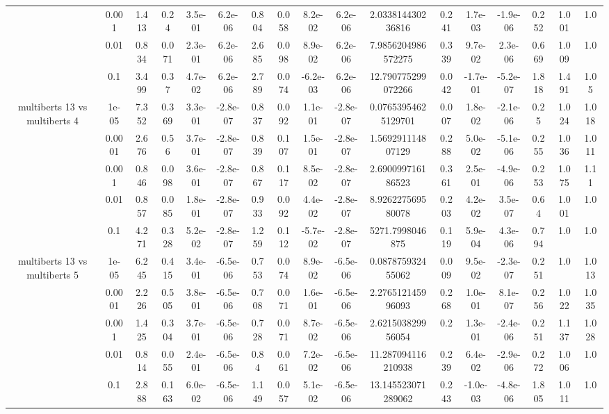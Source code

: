 \begin{tabular}{|c|c|c|c|c|c|c|c|c|c|c|c|c|c|c|c|c|}
 & 0.001 & 1.413 & 0.24 & 3.5e-01 & 6.2e-06 & 0.804 & 0.058 & 8.2e-02 & 6.2e-06 & 2.033814430236816 & 0.241 & 1.7e-03 & -1.9e-06 & 0.252 & 1.001 & 1.0 \\
 & 0.01 & 0.834 & 0.071 & 2.3e-01 & 6.2e-06 & 2.685 & 0.098 & 8.9e-02 & 6.2e-06 & 7.9856204986572275 & 0.339 & 9.7e-02 & 2.3e-06 & 0.669 & 1.009 & 1.0 \\
 & 0.1 & 3.499 & 0.37 & 4.7e-02 & 6.2e-06 & 2.789 & 0.074 & -6.2e-03 & 6.2e-06 & 12.790775299072266 & 0.042 & -1.7e-01 & -5.2e-07 & 1.818 & 1.491 & 1.05 \\
\hline
\multirow{5}{*}{multiberts 13 vs multiberts 4} & 1e-05 & 7.352 & 0.369 & 3.3e-01 & -2.8e-07 & 0.837 & 0.092 & 1.1e-01 & -2.8e-07 & 0.07653954625129701 & 0.007 & 1.8e-02 & -2.1e-06 & 0.25 & 1.024 & 1.018 \\
 & 0.0001 & 2.676 & 0.56 & 3.7e-01 & -2.8e-07 & 0.839 & 0.107 & 1.5e-01 & -2.8e-07 & 1.569291114807129 & 0.288 & 5.0e-02 & -5.1e-06 & 0.255 & 1.036 & 1.011 \\
 & 0.001 & 0.846 & 0.098 & 3.6e-01 & -2.8e-07 & 0.867 & 0.117 & 8.5e-02 & -2.8e-07 & 2.690099716186523 & 0.361 & 2.5e-01 & -4.9e-06 & 0.253 & 1.075 & 1.11 \\
 & 0.01 & 0.857 & 0.085 & 1.8e-01 & -2.8e-07 & 0.933 & 0.092 & 4.4e-02 & -2.8e-07 & 8.926227569580078 & 0.203 & 4.2e-02 & 3.5e-07 & 0.64 & 1.001 & 1.0 \\
 & 0.1 & 4.271 & 0.328 & 5.2e-02 & -2.8e-07 & 1.259 & 0.112 & -5.7e-02 & -2.8e-07 & 5271.7998046875 & 0.119 & 5.9e-04 & 4.3e-06 & 0.794 & 1.0 & 1.0 \\
\hline
\multirow{5}{*}{multiberts 13 vs multiberts 5} & 1e-05 & 6.245 & 0.415 & 3.4e-01 & -6.5e-06 & 0.753 & 0.074 & 8.9e-02 & -6.5e-06 & 0.087875932455062 & 0.009 & 9.5e-02 & -2.3e-07 & 0.251 & 1.0 & 1.013 \\
 & 0.0001 & 2.226 & 0.505 & 3.8e-01 & -6.5e-06 & 0.708 & 0.071 & 1.6e-01 & -6.5e-06 & 2.276512145996093 & 0.268 & 1.0e-01 & 8.1e-07 & 0.256 & 1.022 & 1.035 \\
 & 0.001 & 1.425 & 0.304 & 3.7e-01 & -6.5e-06 & 0.728 & 0.071 & 8.7e-02 & -6.5e-06 & 2.621503829956054 & 0.2 & 1.3e-01 & -2.4e-06 & 0.251 & 1.137 & 1.028 \\
 & 0.01 & 0.814 & 0.055 & 2.4e-01 & -6.5e-06 & 0.84 & 0.061 & 7.2e-02 & -6.5e-06 & 11.287094116210938 & 0.239 & 6.4e-02 & -2.9e-06 & 0.272 & 1.006 & 1.0 \\
 & 0.1 & 2.888 & 0.163 & 6.0e-02 & -6.5e-06 & 1.149 & 0.057 & 5.1e-02 & -6.5e-06 & 13.145523071289062 & 0.243 & -1.0e-03 & -4.8e-06 & 1.805 & 1.011 & 1.0 \\

\end{tabular}
